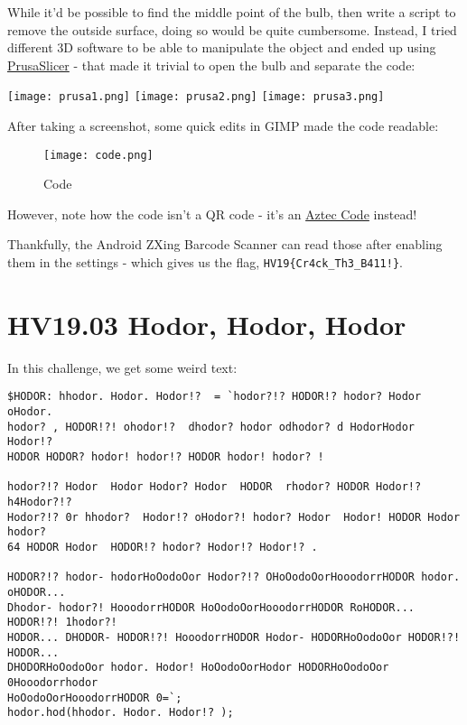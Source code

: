 \documentclass[11pt]{article}
\begin{document}
While it'd be possible to find the middle point of the bulb, then write
a script to remove the outside surface, doing so would be quite
cumbersome. Instead, I tried different 3D software to be able to
manipulate the object and ended up using
\href{https://www.prusa3d.com/prusaslicer/}{PrusaSlicer} - that made it
trivial to open the bulb and separate the code:

\texttt{[image: prusa1.png]} \texttt{[image: prusa2.png]} \texttt{[image: prusa3.png]}

After taking a screenshot, some quick edits in GIMP made the code
readable:

\begin{figure}
\centering
\texttt{[image: code.png]}
\caption{Code}
\end{figure}

However, note how the code isn't a QR code - it's an
\href{https://en.wikipedia.org/wiki/Aztec_Code}{Aztec Code} instead!

Thankfully, the Android ZXing Barcode Scanner can read those after
enabling them in the settings - which gives us the flag,
\texttt{HV19\{Cr4ck\_Th3\_B411!\}}.


    
    
\pagebreak{}
    \hypertarget{hv19.03-hodor-hodor-hodor}{%
\section{HV19.03 Hodor, Hodor, Hodor}\label{hv19.03-hodor-hodor-hodor}}

In this challenge, we get some weird text:

\begin{verbatim}
$HODOR: hhodor. Hodor. Hodor!?  = `hodor?!? HODOR!? hodor? Hodor oHodor.
hodor? , HODOR!?! ohodor!?  dhodor? hodor odhodor? d HodorHodor  Hodor!?
HODOR HODOR? hodor! hodor!? HODOR hodor! hodor? ! 

hodor?!? Hodor  Hodor Hodor? Hodor  HODOR  rhodor? HODOR Hodor!?  h4Hodor?!?
Hodor?!? 0r hhodor?  Hodor!? oHodor?! hodor? Hodor  Hodor! HODOR Hodor hodor?
64 HODOR Hodor  HODOR!? hodor? Hodor!? Hodor!? .

HODOR?!? hodor- hodorHoOodoOor Hodor?!? OHoOodoOorHooodorrHODOR hodor. oHODOR...
Dhodor- hodor?! HooodorrHODOR HoOodoOorHooodorrHODOR RoHODOR... HODOR!?! 1hodor?!
HODOR... DHODOR- HODOR!?! HooodorrHODOR Hodor- HODORHoOodoOor HODOR!?! HODOR...
DHODORHoOodoOor hodor. Hodor! HoOodoOorHodor HODORHoOodoOor 0Hooodorrhodor
HoOodoOorHooodorrHODOR 0=`;
hodor.hod(hhodor. Hodor. Hodor!? );
\end{verbatim}
\end{document}
